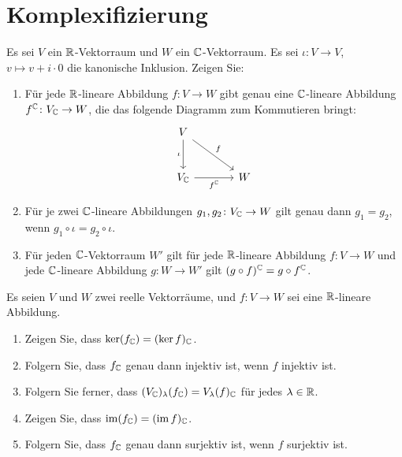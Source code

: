 \section{Komplexifizierung}







\begin{question}[subtitle = Universelle Eigenschaft der Komplexifizierung]{1}
  Es sei $V$ ein $\mathbb{R}$-Vektorraum und $W$ ein $\mathbb{C}$-Vektorraum.
  Es sei $\iota \colon V \to V$, $v \mapsto v + i \cdot 0$ die kanonische Inklusion.
  Zeigen Sie:
  \begin{enumerate}[leftmargin=*]
    \item
      Für jede $\mathbb{R}$-lineare Abbildung $f \colon V \to W$ gibt genau eine $\mathbb{C}$-lineare Abbildung $f^{\mathbb{C}} \colon V_{\mathbb{C}} \to W$, die das folgende Diagramm zum Kommutieren bringt:
      \[
        \begin{tikzcd}[row sep = large, column sep = large, ampersand replacement=\&]
                V       \arrow{d}[swap]{\iota}
                        \arrow{rd}{f}
            \&  {}
          \\
                V_\Cbb  \arrow{r}[swap]{f^\Cbb}
            \&  W
        \end{tikzcd}
      \]
    \item
      Für je zwei $\mathbb{C}$-lineare Abbildungen $g_1, g_2 \colon V_{\mathbb{C}} \to W$ gilt genau dann $g_1 = g_2$, wenn $g_1 \circ \iota = g_2 \circ \iota$.
    \item
      Für jeden $\mathbb{C}$-Vektorraum $W'$ gilt für jede $\mathbb{R}$-lineare Abbildung $f \colon V \to W$ und jede $\mathbb{C}$-lineare Abbildung $g \colon W \to W'$ gilt $(g \circ f)^{\mathbb{C}} = g \circ f^{\mathbb{C}}$.
  \end{enumerate}
\end{question}


\begin{question}[subtitle = Kern und Bild unter Komplexifizierung]{1}
  Es seien $V$ und $W$ zwei reelle Vektorräume, und $f \colon V \to W$ sei eine $\mathbb{R}$-lineare Abbildung.
  \begin{enumerate}[leftmargin=*]
    \item
      Zeigen Sie, dass $\ker (f_{\mathbb{C}}) = (\ker f)_{\mathbb{C}}$.
    \item
      Folgern Sie, dass $f_{\mathbb{C}}$ genau dann injektiv ist, wenn $f$ injektiv ist.
    \item
      Folgern Sie ferner, dass $(V_{\mathbb{C}})_\lambda(f_{\mathbb{C}}) = V_\lambda(f)_{\mathbb{C}}$ für jedes $\lambda \in \mathbb{R}$.
    \item
      Zeigen Sie, dass $\operatorname{im} (f_{\mathbb{C}}) = (\operatorname{im} f)_{\mathbb{C}}$.
    \item
      Folgern Sie, dass $f_{\mathbb{C}}$ genau dann surjektiv ist, wenn $f$ surjektiv ist.
  \end{enumerate}
\end{question}





